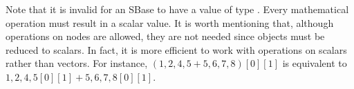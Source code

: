 {\color{red} Note that it is invalid for an SBase to have a value of
  type .  Every mathematical operation must result in a
  scalar value. 
}
{\color{red} It is worth mentioning that, although operations on  nodes are
  allowed, they are not needed since  objects must be
  reduced to scalars.  In fact, it is more efficient to work with
  operations on scalars rather than vectors. For instance, $({{1,
      2},{4,5}}+{{5,6},{7,8}})[0][1]$ is equivalent to ${{1,
      2},{4,5}}[0][1] + {{5,6},{7,8}}[0][1]$.
}